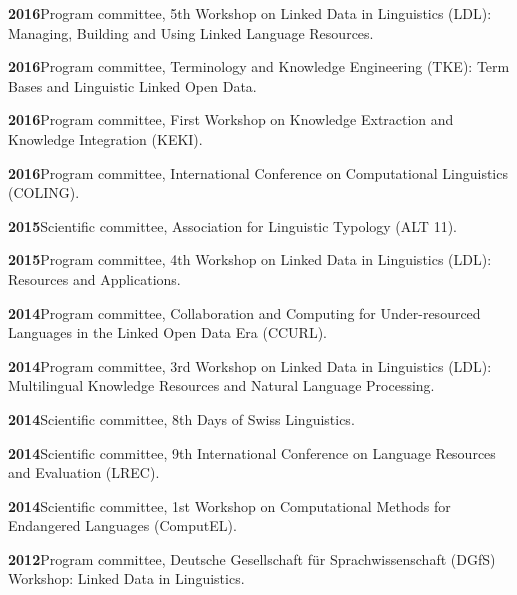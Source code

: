 \documentclass[11pt]{article}
\newcommand{\hangpara}{
 \setlength{\parindent}{0in} %
 \hangindent=0.42in %
}
\begin{document}
\vskip 6pt
\hangpara
{\bf 2016}\hspace{1ex}Program committee, 5th Workshop on Linked Data in Linguistics (LDL): Managing, Building and Using Linked Language Resources.

\vskip 6pt
\hangpara
{\bf 2016}\hspace{1ex}Program committee, Terminology and Knowledge Engineering (TKE): Term Bases and Linguistic Linked Open Data.

\vskip 6pt
\hangpara
{\bf 2016}\hspace{1ex}Program committee, First Workshop on Knowledge Extraction and Knowledge Integration (KEKI).

\vskip 6pt
\hangpara
{\bf 2016}\hspace{1ex}Program committee, International Conference on Computational Linguistics (COLING).

\vskip 6pt
\hangpara
{\bf 2015}\hspace{1ex}Scientific committee, Association for Linguistic Typology (ALT 11).

\vskip 6pt
\hangpara
{\bf 2015}\hspace{1ex}Program committee, 4th Workshop on Linked Data in Linguistics (LDL): Resources and Applications.

\vskip 6pt
\hangpara
{\bf 2014}\hspace{1ex}Program committee, Collaboration and Computing for Under-resourced Languages in the Linked Open Data Era (CCURL).

\vskip 6pt
\hangpara
{\bf 2014}\hspace{1ex}Program committee, 3rd Workshop on Linked Data in Linguistics (LDL): Multilingual Knowledge Resources and Natural Language Processing.

\vskip 6pt
\hangpara
{\bf 2014}\hspace{1ex}Scientific committee, 8th Days of Swiss Linguistics.

\vskip 6pt
\hangpara
{\bf 2014}\hspace{1ex}Scientific committee, 9th International Conference on Language Resources and Evaluation (LREC).

\vskip 6pt
\hangpara
{\bf 2014}\hspace{1ex}Scientific committee, 1st Workshop on Computational Methods for Endangered Languages (ComputEL).

\vskip 6pt
\hangpara
{\bf 2012}\hspace{1ex}Program committee, Deutsche Gesellschaft f{\"u}r Sprachwissenschaft (DGfS) Workshop: Linked Data in Linguistics.
\end{document}
